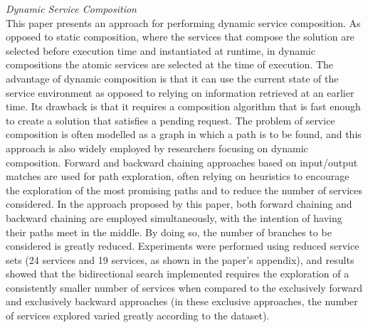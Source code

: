 \textit{Dynamic Service Composition \cite{khakhkhar2012dynamic}}\\
This paper presents an approach for performing dynamic service composition. As opposed to static composition, where the services that compose the solution
are selected before execution time and instantiated at runtime, in dynamic compositions the atomic services are selected at the time of execution. The advantage
of dynamic composition is that it can use the current state of the service environment as opposed to relying on information retrieved at an earlier time.
Its drawback is that it requires a composition algorithm that is fast enough to create a solution that satisfies a pending request. The problem of
service composition is often modelled as a graph in which a path is to be found, and this approach is also widely employed by researchers focusing
on dynamic composition. Forward and backward chaining approaches based on input/output matches are used for path exploration, often relying on heuristics
to encourage the exploration of the most promising paths and to reduce the number of services considered. In the approach proposed by this paper, both
forward chaining and backward chaining are employed simultaneously, with the intention of having their paths meet in the middle. By doing so, the number of
branches to be considered is greatly reduced. Experiments were performed using reduced service sets (24 services and 19 services, as shown in the paper's
appendix), and results showed that the bidirectional search implemented requires the exploration of a consistently smaller number of services when compared
to the exclusively forward and exclusively backward approaches (in these exclusive approaches, the number of services explored varied greatly according
to the dataset).

